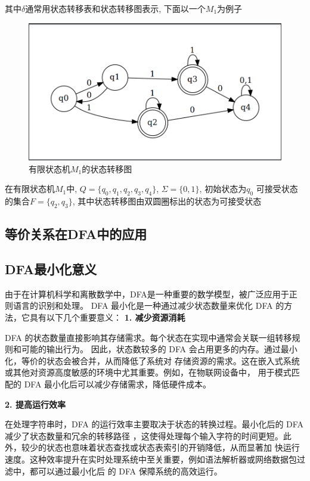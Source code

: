\documentclass{article}
\begin{document}
    其中$\delta$通常用状态转移表和状态转移图表示, 下面以一个$M_1$为例子
    \begin{figure}[h]
        \centering
        \includegraphics[scale=0.2]{../Img/dfa_example.png}
        \caption{有限状态机$M_1$的状态转移图}
    \end{figure}
    在有限状态机$M_1$中, $Q=\{q_0, q_1,q_2,q_3,q_4\}$, $\Sigma = \{0,1\}$, 初始状态为$q_0$
    可接受状态的集合$F = \{q_2, q_3\}$, 其中状态转移图由双圆圈标出的状态为可接受状态


\subsection{等价关系在DFA中的应用}

\subsection{DFA最小化意义}

由于在计算机科学和离散数学中，DFA是一种重要的数学模型，被广泛应用于正则语言的识别和处理。
DFA 最小化是一种通过减少状态数量来优化 DFA 的方法，它具有以下几个重要意义： 
\textbf{1. 减少资源消耗}

DFA 的状态数量直接影响其存储需求。每个状态在实现中通常会关联一组转移规则和可能的输出行为。
因此，状态数较多的 DFA 会占用更多的内存。通过最小化，等价的状态会被合并，从而降低了系统对
存储资源的需求。这在嵌入式系统或其他对资源高度敏感的环境中尤其重要。例如，在物联网设备中，
用于模式匹配的 DFA 最小化后可以减少存储需求，降低硬件成本。

\textbf{2. 提高运行效率}

在处理字符串时，DFA 的运行效率主要取决于状态的转换过程。最小化后的 DFA 减少了状态数量和冗余的转移路径
，这使得处理每个输入字符的时间更短。此外，较少的状态也意味着状态查找或状态表索引的开销降低，从而显著加
快运行速度。这种效率提升在实时处理系统中至关重要，例如语法解析器或网络数据包过滤中，都可以通过最小化后
的 DFA 保障系统的高效运行。
\end{document}
